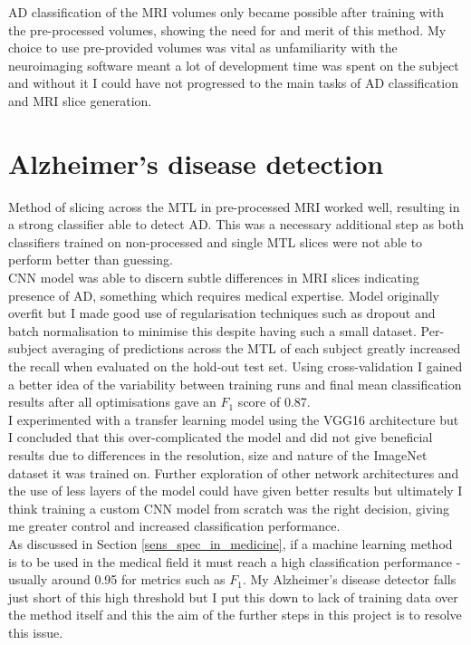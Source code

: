 \documentclass[
    author={Kai Hulme},
    supervisor={Dr Jon Bird},
    degree={BSc},
    title={Generative Adversarial Networks as an Augmentation Technique},
    subtitle={for Alzheimer's Disease Detection in MRI Volumes},
    type={Research},
    year={2021} 
]{dissertation}
\begin{document}
AD classification of the MRI volumes only became possible after training with the pre-processed volumes, showing the need for and merit of this method. My choice to use pre-provided volumes was vital as unfamiliarity with the neuroimaging software meant a lot of development time was spent on the subject and without it I could have not progressed to the main tasks of AD classification and MRI slice generation.


\section{Alzheimer's disease detection}	

Method of slicing across the MTL in pre-processed MRI worked well, resulting in a strong classifier able to detect AD. This was a necessary additional step as both classifiers trained on non-processed and single MTL slices were not able to perform better than guessing. \\

CNN model was able to discern subtle differences in MRI slices indicating presence of AD, something which requires medical expertise. Model originally overfit but I made good use of regularisation techniques such as dropout and batch normalisation to minimise this despite having such a small dataset. Per-subject averaging of predictions across the MTL of each subject greatly increased the recall when evaluated on the hold-out test set. Using cross-validation I gained a better idea of the variability between training runs and final mean classification results after all optimisations gave an $F_1$ score of 0.87. \\

I experimented with a transfer learning model using the VGG16 architecture but I concluded that this over-complicated the model and did not give beneficial results due to differences in the resolution, size and nature of the ImageNet dataset it was trained on. Further exploration of other network architectures and the use of less layers of the model could have given better results but ultimately I think training a custom CNN model from scratch was the right decision, giving me greater control and increased classification performance. \\

As discussed in Section \ref{sens_spec_in_medicine}, if a machine learning method is to be used in the medical field it must reach a high classification performance - usually around 0.95 for metrics such as $F_1$. My Alzheimer's disease detector falls just short of this high threshold but I put this down to lack of training data over the method itself and this the aim of the further steps in this project is to resolve this issue.
\end{document}
